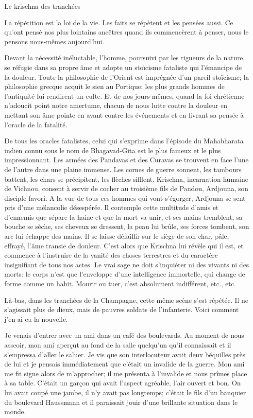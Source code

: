 \begin{chapter}{Le krischna des tranchées}

La répétition est la loi de la vie. Les faits se répètent et les pensées
aussi. Ce qu'ont pensé nos plus lointains ancêtres quand ils
commencèrent à penser, nous le pensons nous-mêmes aujourd'hui.

Devant la nécessité inéluctable, l'homme, poursuivi par les rigueurs de
la nature, se réfugie dans sa propre âme et adopte un stoïcisme
fataliste qui l'émancipe de la douleur. Toute la philosophie de l'Orient
est imprégnée d'un pareil stoïcisme; la philosophie grecque acquit le
sien au Portique; les plus grands hommes de l'antiquité lui rendirent
un culte. Et de nos jours mêmes, quand la foi chrétienne n'adoucit point
notre amertume, chacun de nous lutte contre la douleur en mettant son
âme pointe en avant contre les événements et en livrant sa pensée à
l'oracle de la fatalité.

De tous les oracles fatalistes, celui qui s'exprime dans l'épisode du
Mahabharata indien connu sous le nom de Bhagavad-Gita est le plus fameux
et le plus impressionnant. Les armées des Pandavas et des Curavas se
trouvent en face l'une de l'autre dans une plaine immense. Les cornes de
guerre sonnent, les tambours battent, les chars se précipitent, les
flèches sifflent. Krischna, incarnation humaine de Vichnou, consent à
servir de cocher au troisième fils de Pandou, Ardjouna, son disciple
favori. A la vue de tous ces hommes qui vont s'égorger, Ardjouna se sent
pris d'une mélancolie désespérée. Il contemple cette multitude d'amis
et d'ennemis que sépare la haine et que la mort va unir, et ses mains
tremblent, sa bouche se sèche, ses cheveux se dressent, la peau lui
brûle, ses forces tombent, son arc lui échappe des mains. Il se laisse
défaillir sur le siège de son char, pâle, effrayé, l'âme transie de
douleur. C'est alors que Krischna lui révèle qui il est, et commence à
l'instruire de la vanité des choses terrestres et du caractère
insignifiant de tous nos actes. Le vrai sage ne doit s'inquiéter ni des
vivants ni des morts: le corps n'est que l'enveloppe d'une intelligence
immortelle, qui change de forme comme un habit. Mourir ou tuer, c'est
absolument indifférent, etc., etc.

Là-bas, dans les tranchées de la Champagne, cette même scène s'est
répétée. Il ne s'agissait plus de dieux, mais de pauvres soldats de
l'infanterie. Voici comment j'en ai eu la nouvelle.

Je venais d'entrer avec un ami dans un café des boulevards. Au moment de
nous asseoir, mon ami aperçut au fond de la salle quelqu'un qu'il
connaissait et il s'empressa d'aller le saluer. Je vis que son
interlocuteur avait deux béquilles près de lui et je pensais
immédiatement que c'était un invalide de la guerre. Mon ami me fit signe
alors de m'approcher; il me présenta à l'invalide et nous prîmes place à
sa table. C'était un garçon qui avait l'aspect agréable, l'air ouvert et
bon. On lui avait coupé une jambe, il n'y avait pas longtemps; c'était
le fils d'un banquier du boulevard Haussmann et il paraissait jouir
d'une brillante situation dans le monde.


\end{chapter}
